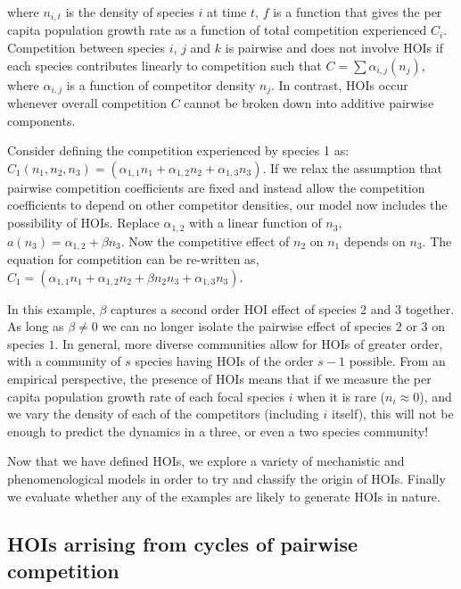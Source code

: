 \documentclass[12pt,]{article}
\begin{document}
where \(n_{i,t}\) is the density of species \(i\) at time \(t\), \(f\)
is a function that gives the per capita population growth rate as a
function of total competition experienced \(C_i\). Competition between
species \(i\), \(j\) and \(k\) is pairwise and does not involve HOIs if
each species contributes linearly to competition such that
\(C = \sum\alpha_{i,j}(n_j)\), where \(\alpha_{i,j}\) is a function of
competitor density \(n_j\). In contrast, HOIs occur whenever overall
competition \(C\) cannot be broken down into additive pairwise
components.

Consider defining the competition experienced by species 1 as:
\(C_1(n_1,n_2,n_3) = (\alpha_{1,1}n_{1} + \alpha_{1,2}n_{2} + \alpha_{1,3}n_3)\).
If we relax the assumption that pairwise competition coefficients are
fixed and instead allow the competition coefficients to depend on other
competitor densities, our model now includes the possibility of HOIs.
Replace \(\alpha_{1,2}\) with a linear function of \(n_3\),
\(a(n_3) = \alpha_{1,2} + \beta n_3\). Now the competitive effect of
\(n_{2}\) on \(n_{1}\) depends on \(n_3\). The equation for competition
can be re-written as,
\(C_1 = (\alpha_{1,1}n_{1} + \alpha_{1,2}n_{2} + \beta n_{2}n_{3} + \alpha_{1,3}n_{3})\).

In this example, \(\beta\) captures a second order HOI effect of species
\(2\) and \(3\) together. As long as \(\beta \neq 0\) we can no longer
isolate the pairwise effect of species \(2\) or \(3\) on species \(1\).
In general, more diverse communities allow for HOIs of greater order,
with a community of \(s\) species having HOIs of the order \(s-1\)
possible. From an empirical perspective, the presence of HOIs means that
if we measure the per capita population growth rate of each focal
species \(i\) when it is rare (\(n_i \approx 0\)), and we vary the
density of each of the competitors (including \(i\) itself), this will
not be enough to predict the dynamics in a three, or even a two species
community!

Now that we have defined HOIs, we explore a variety of mechanistic and
phenomenological models in order to try and classify the origin of HOIs.
Finally we evaluate whether any of the examples are likely to generate
HOIs in nature.

\subsection{HOIs arrising from cycles of pairwise
competition}\label{hois-arrising-from-cycles-of-pairwise-competition}
\end{document}
